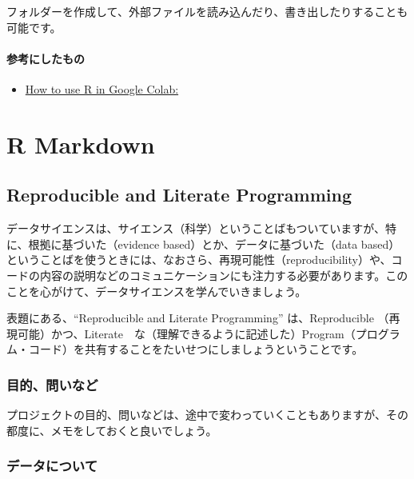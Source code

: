 \documentclass[
]{bxjsbook}
\providecommand{\tightlist}{%
  \setlength{\itemsep}{0pt}\setlength{\parskip}{0pt}}
\theoremstyle{definition}
\theoremstyle{definition}
\theoremstyle{definition}
\theoremstyle{definition}
\theoremstyle{remark}
\begin{document}
フォルダーを作成して、外部ファイルを読み込んだり、書き出したりすることも可能です。

\hypertarget{ux53c2ux8003ux306bux3057ux305fux3082ux306e}{%
\paragraph{参考にしたもの}\label{ux53c2ux8003ux306bux3057ux305fux3082ux306e}}

\begin{itemize}
\tightlist
\item
  \href{https://towardsdatascience.com/how-to-use-r-in-google-colab-b6e02d736497}{How to use R in Google Colab:}
\end{itemize}

\hypertarget{rmarkdown}{%
\section{R Markdown}\label{rmarkdown}}

\hypertarget{reproducible-and-literate-programming}{%
\subsection{Reproducible and Literate Programming}\label{reproducible-and-literate-programming}}

データサイエンスは、サイエンス（科学）ということばもついていますが、特に、根拠に基づいた（evidence based）とか、データに基づいた（data based）ということばを使うときには、なおさら、再現可能性（reproducibility）や、コードの内容の説明などのコミュニケーションにも注力する必要があります。このことを心がけて、データサイエンスを学んでいきましょう。

表題にある、``Reproducible and Literate Programming'' は、Reproducible （再現可能）かつ、Literate　な（理解できるように記述した）Program（プログラム・コード）を共有することをたいせつにしましょうということです。

\hypertarget{ux76eeux7684ux554fux3044ux306aux3069}{%
\subsubsection{目的、問いなど}\label{ux76eeux7684ux554fux3044ux306aux3069}}

プロジェクトの目的、問いなどは、途中で変わっていくこともありますが、その都度に、メモをしておくと良いでしょう。

\hypertarget{ux30c7ux30fcux30bfux306bux3064ux3044ux3066}{%
\subsubsection{データについて}\label{ux30c7ux30fcux30bfux306bux3064ux3044ux3066}}
\end{document}
